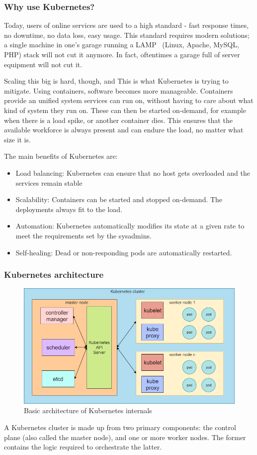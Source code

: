 \subsubsection{Why use Kubernetes?}
Today, users of online services are used to a high standard - fast response times, no downtime, no data loss, easy usage. This standard requires modern solutions; a single machine in one's garage running a LAMP~\cite{lamp} (Linux, Apache, MySQL, PHP) stack will not cut it anymore. In fact, oftentimes a garage full of server equipment will not cut it.

Scaling this big is hard, though, and This is what Kubernetes is trying to mitigate. Using containers, software becomes more manageable. Containers provide an unified system services can run on, without having to care about what kind of system they run on. These can then be started on-demand, for example when there is a load spike, or another container dies. This ensures that the available workforce is always present and can endure the load, no matter what size it is.

\noindent
The main benefits of Kubernetes are:
\begin{itemize}
	\item Load balancing: Kubernetes can ensure that no host gets overloaded and the services remain stable
	\item Scalability: Containers can be started and stopped on-demand. The deployments always fit to the load.
	\item Automation: Kubernetes automatically modifies its state at a given rate to meet the requirements set by the sysadmins.
	\item Self-healing: Dead or non-responding pods are automatically restarted.
\end{itemize}

\subsubsection{Kubernetes architecture}
\begin{figure}[H]
	\centering
	\includegraphics[width=\textwidth]{images/kube-arch-1.png}
	\caption{Basic architecture of Kubernetes internals}
	\label{fig:kube-arch}
\end{figure}
A Kubernetes cluster is made up from two primary components: the control plane (also called the master node), and one or more worker nodes. The former contains the logic required to orchestrate the latter.

